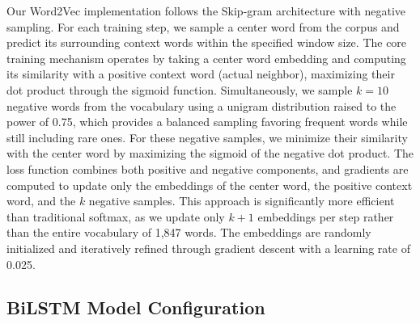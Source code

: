 \documentclass[11pt]{article}
\begin{document}
Our Word2Vec implementation follows the Skip-gram architecture with negative sampling. For each training step, we sample a center word from the corpus and predict its surrounding context words within the specified window size. The core training mechanism operates by taking a center word embedding and computing its similarity with a positive context word (actual neighbor), maximizing their dot product through the sigmoid function. Simultaneously, we sample $k=10$ negative words from the vocabulary using a unigram distribution raised to the power of 0.75, which provides a balanced sampling favoring frequent words while still including rare ones. For these negative samples, we minimize their similarity with the center word by maximizing the sigmoid of the negative dot product. The loss function combines both positive and negative components, and gradients are computed to update only the embeddings of the center word, the positive context word, and the $k$ negative samples. This approach is significantly more efficient than traditional softmax, as we update only $k+1$ embeddings per step rather than the entire vocabulary of 1,847 words. The embeddings are randomly initialized and iteratively refined through gradient descent with a learning rate of 0.025.

\subsection{BiLSTM Model Configuration}
\end{document}
